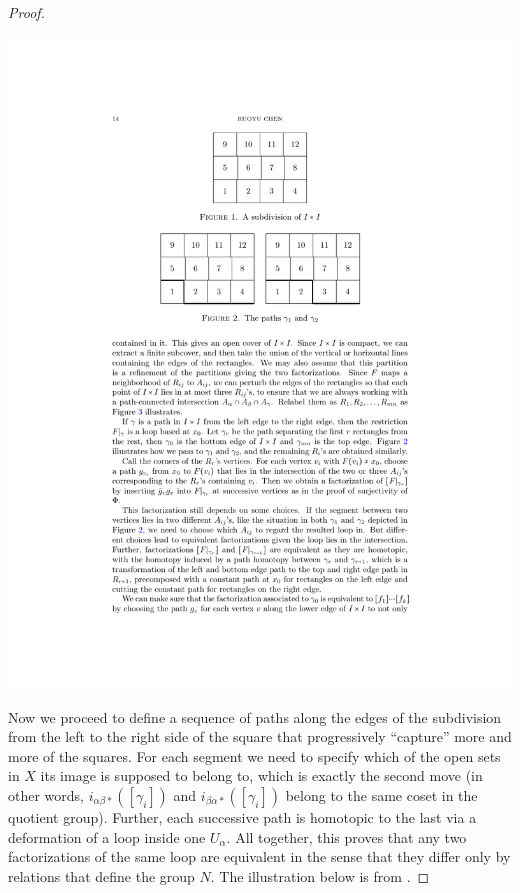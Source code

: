 \begin{proof}
    \begin{center}
        \includegraphics[scale=0.75]{figures/subdivision.pdf}
    \end{center}

    Now we proceed to define a sequence of paths along the edges of the subdivision from the left to the right side of the square that progressively ``capture'' more and more of the squares. For each segment we need to specify which of the open sets in $X$ its image is supposed to belong to, which is exactly the second move (in other words, $i_{\alpha\beta\ast}([\gamma_i])$ and $i_{\beta\alpha\ast}([\gamma_i])$ belong to the same coset in the quotient group). Further, each successive path is homotopic to the last via a deformation of a loop inside one $U_\alpha$. All together, this proves that any two factorizations of the same loop are equivalent in the sense that they differ only by relations that define the group $N$. The illustration below is from \cite[Chapter 10]{LeeTop}.


\end{proof}
